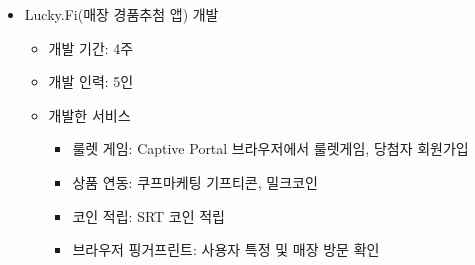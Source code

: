 
\begin{itemize}
	\item Lucky.Fi(매장 경품추첨 앱) 개발
	      \begin{itemize}[label=$\star$]
		      \item 개발 기간: 4주
		      \item 개발 인력: 5인
		      \item 개발한 서비스
		            \begin{itemize}
			            \item 룰렛 게임: Captive Portal 브라우저에서 룰렛게임, 당첨자 회원가입
			            \item 상품 연동: 쿠프마케팅 기프티콘, 밀크코인
			            \item 코인 적립: SRT 코인 적립
			            \item 브라우저 핑거프린트: 사용자 특정 및 매장 방문 확인
		            \end{itemize}
	      \end{itemize}
\end{itemize}


